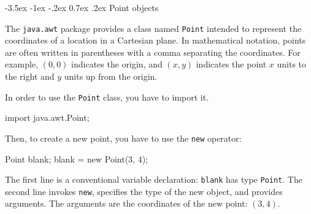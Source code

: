\documentclass[12pt]{book}
\makeatletter
\theoremstyle{exercise}
\newcommand{\java}[1]{\verb"#1"}
\renewcommand{\section}{\@startsection{section}{1}{\z@}%
    {-3.5ex \@plus -1ex \@minus -.2ex}%
    {0.7ex \@plus.2ex}%
    {\normalfont\Large\bfseries}}
\newcommand{\java}[1]{\lstinline{#1}} %
\makeatother
\begin{document}






\section{Point objects}

The \java{java.awt} package provides a class named \java{Point} intended to represent the coordinates of a location in a Cartesian plane.
In mathematical notation, points are often written in parentheses with a comma separating the coordinates.
For example, $(0,0)$ indicates the origin, and $(x,y)$ indicates the point $x$ units to the right and $y$ units up from the origin.


In order to use the \java{Point} class, you have to import it.

\begin{code}
import java.awt.Point;
\end{code}

Then, to create a new point, you have to use the \java{new} operator:

\begin{code}
    Point blank;
    blank = new Point(3, 4);
\end{code}


The first line is a conventional variable declaration: \java{blank} has type \java{Point}.
The second line invokes \java{new}, specifies the type of the new object, and provides arguments.
The arguments are the coordinates of the new point: $(3, 4)$.
\end{document}
